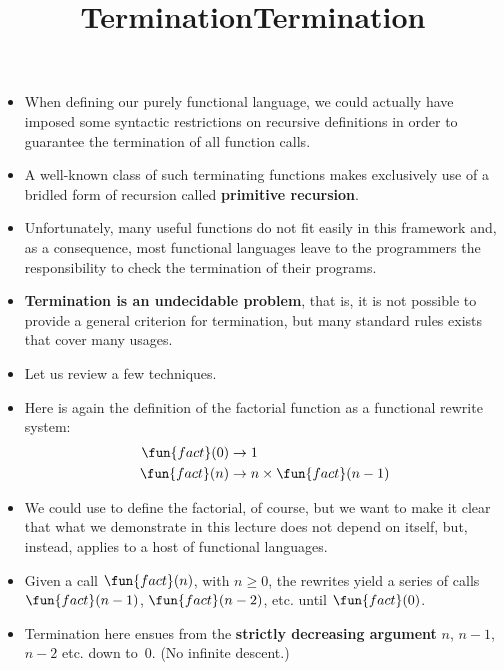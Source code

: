 \documentclass[wide]{slides}
\begin{document}
\begin{slide}
  \title{Termination}

  \begin{itemize}

    \item When defining our purely functional language, we could
      actually have imposed some syntactic restrictions on recursive
      definitions in order to guarantee the termination of all
      function calls.

    \item A well\hyp{}known class of such terminating functions makes
      exclusively use of a bridled form of recursion called
      \textbf{primitive recursion}.

    \item Unfortunately, many useful functions do not fit easily in
      this framework and, as a consequence, most functional languages
      leave to the programmers the responsibility to check the
      termination of their programs.

    \item \textbf{Termination is an undecidable problem}, that is, it
      is not possible to provide a general criterion for termination,
      but many standard rules exists that cover many usages.

    \item Let us review a few techniques.

  \end{itemize}

\end{slide}

\begin{slide}
  \title{Termination}

  \begin{itemize}

    \item Here is again the definition of the factorial function as a
      functional rewrite system:
      \begin{align*}
        \fun{fact}(0) & \rightarrow 1\\
        \fun{fact}(n) & \rightarrow n \times \fun{fact}(n-1)
      \end{align*}

    \item We could use \OCaml to define the factorial, of course, but
      we want to make it clear that what we demonstrate in this
      lecture does not depend on \OCaml itself, but, instead, applies
      to a host of functional languages.

    \item Given a call \(\fun{fact}(n)\), with \(n \geqslant 0\), the
      rewrites yield a series of calls \(\fun{fact}(n-1)\),
      \(\fun{fact}(n-2)\), etc. until \(\fun{fact}(0)\).

    \item Termination here ensues from the \textbf{strictly decreasing
      argument} \(n\), \(n-1\), \(n-2\) etc. down to~\(0\). (No
      infinite descent.)

  \end{itemize}

\end{slide}
\end{document}
